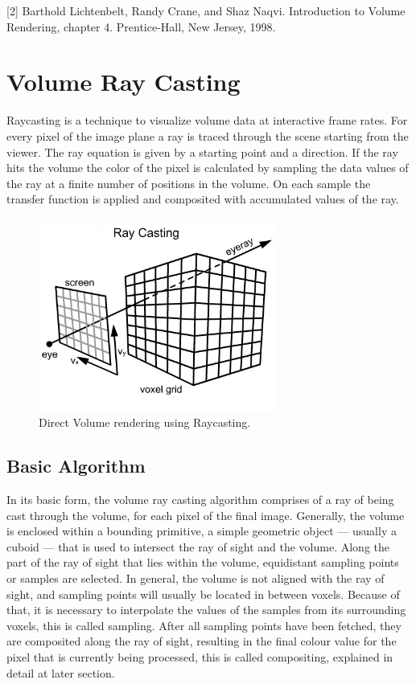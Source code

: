 [2] Barthold Lichtenbelt, Randy Crane, and Shaz Naqvi. Introduction to Volume Rendering, chapter 4. Prentice-Hall, New
Jersey, 1998.

\section{Volume Ray Casting}

Raycasting is a technique to visualize volume data at interactive frame rates. For every pixel of the image plane a ray is traced through the scene starting from the viewer. The ray equation is given by a starting point and a direction. If the ray hits the volume the color of the pixel is calculated by sampling the data values of the ray at a finite number of positions in the volume. On each sample the transfer function is applied and composited with accumulated values of the ray.

\begin{figure}
\centering
\includegraphics[width=220pt]{Images/ray_cast1.jpg}
\caption{\label{fig:ray_cast1.jpg} Direct Volume rendering using Raycasting.}
\end{figure}

\subsection{Basic Algorithm}

In its basic form, the volume ray casting algorithm comprises of a ray of being cast through the volume, for each pixel of the final image. Generally, the volume is enclosed within a bounding primitive, a simple geometric object — usually a cuboid — that is used to intersect the ray of sight and the volume. Along the part of the ray of sight that lies within the volume, equidistant sampling points or samples are selected. In general, the volume is not aligned with the ray of sight, and sampling points will usually be located in between voxels. Because of that, it is necessary to interpolate the values of the samples from its surrounding voxels, this is called sampling. After all sampling points have been fetched, they are composited along the ray of sight, resulting in the final colour value for the pixel that is currently being processed, this is called compositing, explained in detail at later section.

